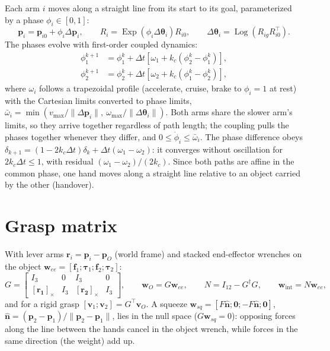 \documentclass[11pt,a4paper]{article}
\newcommand{\vect}[1]{\boldsymbol{#1}}
\newcommand{\skewm}[1]{[\vect{#1}]_\times}
\DeclareMathOperator{\Log}{Log}
\DeclareMathOperator{\Exp}{Exp}
\begin{document}
Each arm $i$ moves along a straight line from its start to its goal, parameterized by a phase $\phi_i\in[0,1]$:
\begin{equation}
  \vect p_i=\vect p_{i0}+\phi_i\Delta\vect p_i,\qquad R_i=\Exp(\phi_i\Delta\vect\theta_i)R_{i0},\qquad
  \Delta\vect\theta_i=\Log(R_{ig}R_{i0}^\top).
\end{equation}
The phases evolve with first-order coupled dynamics:
\begin{align}
  \phi_1^{k+1} &= \phi_1^k+\Delta t\left[\omega_1+k_c(\phi_2^k-\phi_1^k)\right],\\
  \phi_2^{k+1} &= \phi_2^k+\Delta t\left[\omega_2+k_c(\phi_1^k-\phi_2^k)\right],
\end{align}
where $\omega_i$ follows a trapezoidal profile (accelerate, cruise, brake to $\phi_i=1$ at rest) with the
Cartesian limits converted to phase limits, $\bar\omega_i=\min(v_{\max}/\|\Delta\vect p_i\|,\ \omega_{\max}/\|\Delta\vect\theta_i\|)$.
Both arms share the slower arm's limits, so they arrive together regardless of path length; the coupling pulls
the phases together whenever they differ, and $0\le\dot\phi_i\le\bar\omega_i$. The phase difference obeys
$\delta_{k+1}=(1-2k_c\Delta t)\delta_k+\Delta t(\omega_1-\omega_2)$: it converges without oscillation for
$2k_c\Delta t\le1$, with residual $(\omega_1-\omega_2)/(2k_c)$. Since both paths are affine in the common phase, one
hand moves along a straight line relative to an object carried by the other (handover).

\section{Grasp matrix}\label{sec:grasp}

With lever arms $\vect r_i=\vect p_i-\vect p_O$ (world frame) and stacked end-effector wrenches on the object
$\vect w_{ee}=[\vect f_1;\vect\tau_1;\vect f_2;\vect\tau_2]$:
\begin{equation}
  G=\begin{bmatrix} I_3 & 0 & I_3 & 0\\ \skewm{r_1} & I_3 & \skewm{r_2} & I_3\end{bmatrix},\qquad
  \vect w_O=G\vect w_{ee},\qquad N=I_{12}-G^\dagger G,\qquad \vect w_{\mathrm{int}}=N\vect w_{ee},
\end{equation}
and for a rigid grasp $[\vect v_1;\vect v_2]=G^\top\vect v_O$. A squeeze
$\vect w_{sq}=[F\hat{\vect n};\vect 0;-F\hat{\vect n};\vect 0]$, $\hat{\vect n}=(\vect p_2-\vect p_1)/\|\vect p_2-\vect p_1\|$,
lies in the null space ($G\vect w_{sq}=0$): opposing forces along the line between the hands cancel in the object
wrench, while forces in the same direction (the weight) add up.
\end{document}
